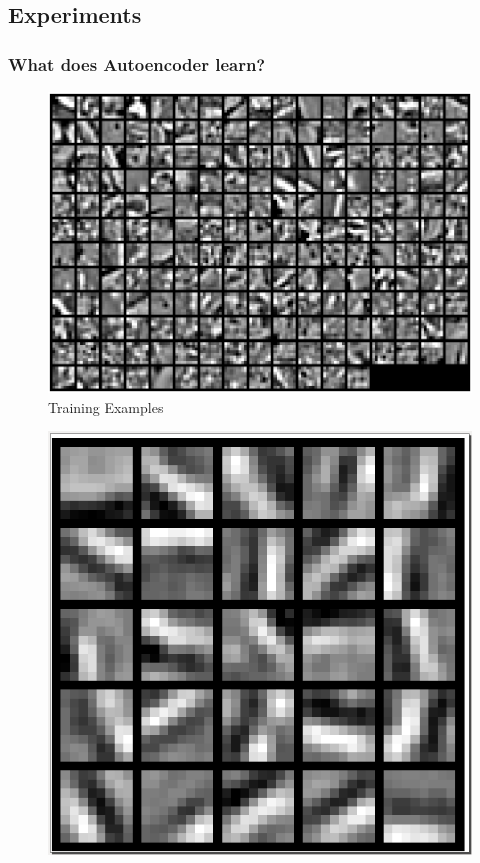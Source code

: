 \documentclass{beamer}
\begin{document}
\begin{CJK*}{UTF8}{gbsn}
\section{Experiments}
\begin{frame}\frametitle{What does Autoencoder learn?}
\begin{minipage}{\linewidth}
\begin{minipage}{0.5\linewidth}
\begin{figure}[H]
\includegraphics[scale=0.18]{images/patches}
\caption{Training Examples}
\end{figure}
\end{minipage}
\begin{minipage}{0.5\linewidth}
\begin{figure}[H]
\includegraphics[scale=0.22]{images/weights}

\end{figure}
\end{minipage}
\end{minipage}
\end{frame}
\end{CJK*}
\end{document}

